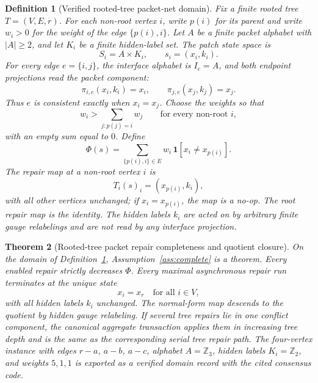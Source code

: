 \documentclass[11pt]{article}
\newtheorem{theorem}{Theorem}[section]
\newtheorem{definition}[theorem]{Definition}
\theoremstyle{remark}
\theoremstyle{plain}
\begin{document}
\begin{definition}[Verified rooted-tree packet-net domain]\label{def:tree-packet-domain}
Fix a finite rooted tree \(T=(V,E,r)\). For each non-root vertex \(i\), write \(p(i)\) for its
parent and write \(w_i>0\) for the weight of the edge \(\{p(i),i\}\). Let \(A\) be a finite
packet alphabet with \(|A|\ge2\), and let \(K_i\) be a finite hidden-label set. The patch state
space is
\[
S_i=A\times K_i,
\qquad
s_i=(x_i,k_i).
\]
For every edge \(e=\{i,j\}\), the interface alphabet is \(I_e=A\), and both endpoint projections
read the packet component:
\[
\pi_{i,e}(x_i,k_i)=x_i,
\qquad
\pi_{j,e}(x_j,k_j)=x_j.
\]
Thus \(e\) is consistent exactly when \(x_i=x_j\). Choose the weights so that
\[
w_i>\sum_{j:p(j)=i}w_j
\qquad
\text{for every non-root } i,
\]
with an empty sum equal to \(0\). Define
\[
\Phi(s)=\sum_{\{p(i),i\}\in E}w_i\,\mathbf 1[x_i\ne x_{p(i)}].
\]
The repair map at a non-root vertex \(i\) is
\[
T_i(s)_i=(x_{p(i)},k_i),
\]
with all other vertices unchanged; if \(x_i=x_{p(i)}\), the map is a no-op. The root repair map is
the identity. The hidden labels \(k_i\) are acted on by arbitrary finite gauge relabelings and are
not read by any interface projection.
\end{definition}

\begin{theorem}[Rooted-tree packet repair completeness and quotient closure]\label{thm:tree-packet-domain}
On the domain of Definition~\ref{def:tree-packet-domain}, Assumption~\ref{ass:complete} is a
theorem. Every enabled repair strictly decreases \(\Phi\). Every maximal asynchronous repair run
terminates at the unique state
\[
x_i=x_r\quad\text{for all }i\in V,
\]
with all hidden labels \(k_i\) unchanged. The normal-form map descends to the quotient by hidden
gauge relabeling. If several tree repairs lie in one conflict component, the canonical aggregate
transaction applies them in increasing tree depth and is the same as the corresponding serial
tree repair path. The four-vertex instance with edges \(r\!-\!a\), \(a\!-\!b\), \(a\!-\!c\),
alphabet \(A=\mathbb Z_3\), hidden labels \(K_i=\mathbb Z_2\), and weights \(5,1,1\) is exported
as a verified domain record with the cited consensus code.
\end{theorem}
\end{document}
